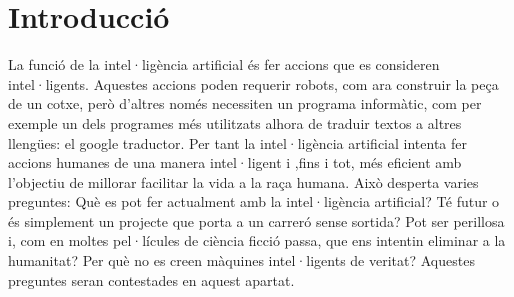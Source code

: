 \section {Introducció}
La funció de la intel·ligència artificial és fer accions que es consideren intel·ligents. Aquestes accions poden requerir robots, com ara construir la peça de un cotxe,
però d'altres només necessiten un programa informàtic, com per exemple un dels programes més utilitzats alhora de traduir textos a altres llengües: el google traductor.
Per tant la intel·ligència artificial intenta fer accions humanes de una manera intel·ligent i ,fins i tot, més eficient amb l'objectiu de millorar 
facilitar la vida a la raça humana.
Això desperta varies preguntes: Què es pot fer actualment amb la intel·ligència artificial? Té futur o és simplement un projecte que porta a un carreró sense sortida? Pot
ser perillosa i, com en moltes pel·lícules de ciència ficció passa, que ens intentin eliminar a la humanitat? Per què no es creen màquines intel·ligents de veritat?
Aquestes preguntes seran contestades en aquest apartat.

